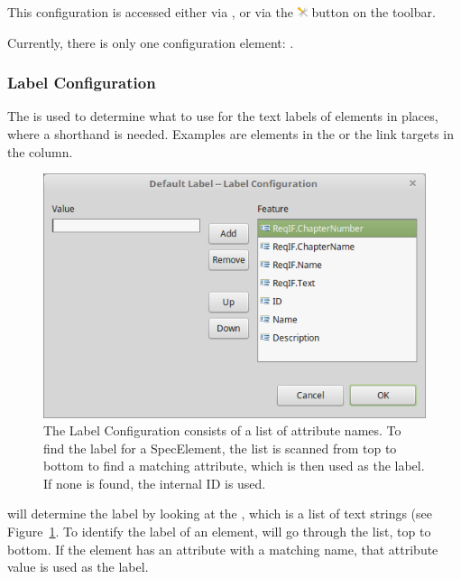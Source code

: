 This configuration is accessed either via , or
via the \includegraphics[height=0.8em]{../rmf-images/ReqIFUIToolExtension.png} button on the toolbar.

Currently, there is only one configuration element: .

\subsubsection{Label Configuration}
\label{sec:label-configuration}

The  is used to determine what to use for the text labels of elements
in places, where a shorthand is needed.  Examples are elements in the  or the link targets in the  column.

\begin{figure}
\centering     
\includegraphics[width=0.8\linewidth]{../rmf-images/label-configuration.png}
\caption{The Label Configuration consists of a list of attribute names. To find the label for a SpecElement, the list is scanned from top to bottom to find a matching attribute, which is then used as the label. If none is found, the internal ID is used.}
\label{fig:label-configuration}
\end{figure}

\pror{} will determine the label by looking at the , which is a list of text strings (see Figure~\ref{fig:label-configuration}.
To identify the label of an element, \pror{} will go through the list, top to bottom.  If the element has an attribute with a matching name, that attribute value is used as the label.

